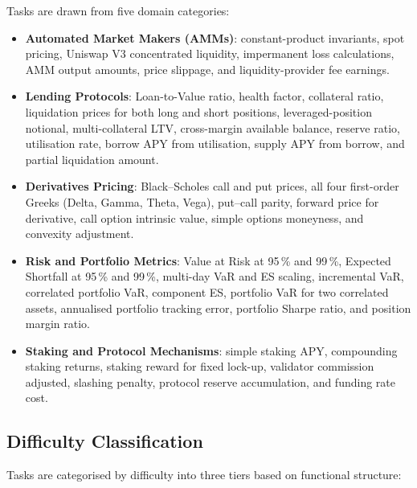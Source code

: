 \documentclass[twoside,11pt]{article}
\begin{document}
Tasks are drawn from five domain categories:
\begin{itemize}
  \item \textbf{Automated Market Makers (AMMs)}: constant-product invariants,
    spot pricing, Uniswap V3 concentrated liquidity, impermanent loss calculations,
    AMM output amounts, price slippage, and liquidity-provider fee earnings.
  \item \textbf{Lending Protocols}: Loan-to-Value ratio, health factor, collateral ratio,
    liquidation prices for both long and short positions, leveraged-position notional,
    multi-collateral LTV, cross-margin available balance, reserve ratio, utilisation rate,
    borrow APY from utilisation, supply APY from borrow, and partial liquidation amount.
  \item \textbf{Derivatives Pricing}: Black--Scholes call and put prices,
    all four first-order Greeks (Delta, Gamma, Theta, Vega), put--call parity,
    forward price for derivative, call option intrinsic value, simple options
    moneyness, and convexity adjustment.
  \item \textbf{Risk and Portfolio Metrics}: Value at Risk at 95\,\% and 99\,\%,
    Expected Shortfall at 95\,\% and 99\,\%, multi-day VaR and ES scaling,
    incremental VaR, correlated portfolio VaR, component ES, portfolio VaR for
    two correlated assets, annualised portfolio tracking error, portfolio Sharpe
    ratio, and position margin ratio.
  \item \textbf{Staking and Protocol Mechanisms}: simple staking APY, compounding
    staking returns, staking reward for fixed lock-up, validator commission adjusted,
    slashing penalty, protocol reserve accumulation, and funding rate cost.
\end{itemize}

\subsection{Difficulty Classification}\label{subsec:difficulty-classification}
\label{sec:bench_difficulty}

Tasks are categorised by difficulty into three tiers based on functional structure:
\end{document}
